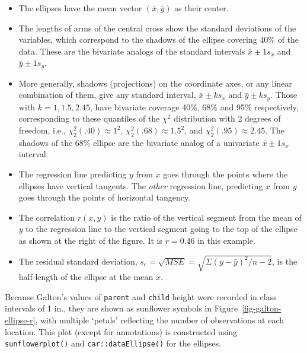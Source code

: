 \documentclass[
  letterpaper,
  10pt,
  krantz2]{krantz}
\begin{document}
\begin{itemize}
\item
  The ellipses have the mean vector \((\bar{x}, \bar{y})\) as their
  center.
\item
  The lengths of arms of the central cross show the standard deviations
  of the variables, which correspond to the shadows of the ellipse
  covering 40\% of the data. These are the bivariate analogs of the
  standard intervals \(\bar{x} \pm 1 s_x\) and \(\bar{y} \pm 1 s_y\).
\item
  More generally, shadows (projections) on the coordinate axes, or any
  linear combination of them, give any standard interval,
  \(\bar{x} \pm k s_x\) and \(\bar{y} \pm k s_y\). Those with
  \(k=1, 1.5, 2.45\), have bivariate coverage 40\%, 68\% and 95\%
  respectively, corresponding to these quantiles of the \(\chi^2\)
  distribution with 2 degrees of freedom, i.e.,
  \(\chi^2_2 (.40) \approx 1^2\), \(\chi^2_2 (.68) \approx 1.5^2\), and
  \(\chi^2_2 (.95) \approx 2.45\). The shadows of the 68\% ellipse are
  the bivariate analog of a univariate \(\bar{x} \pm 1 s_x\) interval.
\item
  The regression line predicting \(y\) from \(x\) goes through the
  points where the ellipses have vertical tangents. The \emph{other}
  regression line, predicting \(x\) from \(y\) goes through the points
  of horizontal tangency.
\item
  The correlation \(r(x, y)\) is the ratio of the vertical segment from
  the mean of \(y\) to the regression line to the vertical segment going
  to the top of the ellipse as shown at the right of the figure. It is
  \(r = 0.46\) in this example.
\item
  The residual standard deviation,
  \(s_e = \sqrt{MSE} = \sqrt{\Sigma (y - \bar{y})^2 / n-2}\), is the
  half-length of the ellipse at the mean \(\bar{x}\).
\end{itemize}

Because Galton's values of \texttt{parent} and \texttt{child} height
were recorded in class intervals of 1 in., they are shown as sunflower
symbols in Figure~\ref{fig-galton-ellipse-r}, with multiple `petals'
reflecting the number of observations at each location. This plot
(except for annotations) is constructed using \texttt{sunflowerplot()}
and \texttt{car::dataEllipse()} for the ellipses.
\end{document}
